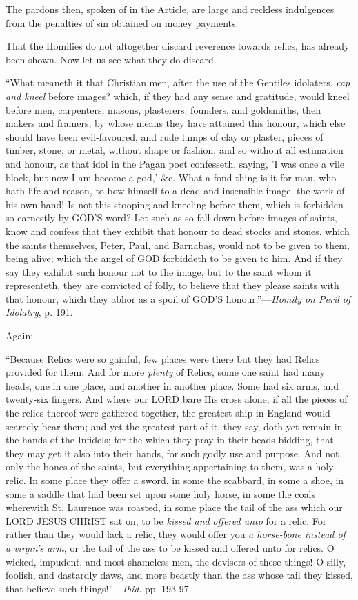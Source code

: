 The pardons then, spoken of in the Article, are large and reckless
indulgences from the penalties of sin obtained on money payments.


That the Homilies do not altogether discard reverence towards
relics, has already been shown. Now let us see what they do discard.

``What meaneth it that Christian men, after the
use of the Gentiles idolaters, \emph{cap and kneel} before images?
which, if they had any sense and gratitude, would kneel before men,
carpenters, masons, plasterers, founders, and goldsmiths, their makers
and framers, by whose means they have attained this honour, which else
should have been evil-favoured, and rude lumps of clay or plaster,
pieces of timber, stone, or metal, without shape or fashion, and so
without all estimation and honour, as that idol in the Pagan poet
confesseth, saying, 'I was once a vile block, but now I am become a
god,' \&c. What a fond thing is it for man, who hath life and
reason, to bow himself to a dead and insensible image, the work of his
own hand! Is not this stooping and kneeling before them, which is
forbidden so earnestly by GOD'S
word? Let such as so fall down before images of saints, know and
confess that they exhibit that honour to dead stocks and stones, which
the saints themselves, Peter, Paul, and Barnabas, would not to be
given to them, being alive; which the angel of GOD
forbiddeth to be given to him. And if they say they exhibit such
honour not to the image, but to the saint whom it representeth, they
are convicted of folly, to believe that they please saints with that
honour, which they abhor as a spoil of GOD'S
honour.''—\emph{Homily on Peril of Idolatry}, p. 191.

Again:—

``Because Relics were so gainful, few places
were there but they had Relics provided for them. And for more \emph{plenty}
of Relics, some one saint had many heads, one in one place, and
another in another place. Some had six arms, and twenty-six fingers.
And where our LORD bare
His cross alone, if all the pieces of the relics thereof were gathered
together, the greatest ship in England would scarcely bear them; and
yet the greatest part of it, they say, doth yet remain in the hands of
the Infidels; for the which they pray in their beads-bidding, that
they may get it also into their hands, for such godly use and purpose.
And not only the bones of the saints, but everything appertaining to
them, was a holy relic. In some place they offer a sword, in some the
scabbard, in some a shoe, in some a saddle that had been set upon some
holy horse, in some the coals wherewith St. Laurence was roasted, in
some place the tail of the ass which our LORD
JESUS CHRIST
sat on, to be \emph{kissed and} \emph{offered unto} for a relic.
For rather than they would lack a relic, they would offer you \emph{a
horse-bone instead of a virgin's arm}, or the tail of the ass to be
kissed and offered unto for relics. O wicked, impudent, and most
shameless men, the devisers of these things! O silly, foolish, and
dastardly daws, and more beastly than the ass whose tail they kissed,
that believe such things!''—\emph{Ibid}. pp. 193-97.

